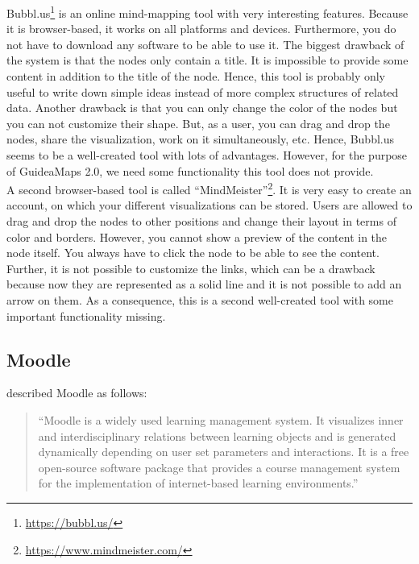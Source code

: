Bubbl.us\footnote{\url{https://bubbl.us/}} is an online mind-mapping tool with very interesting features. Because it is browser-based, it works on all platforms and devices. Furthermore, you do not have to download any software to be able to use it. The biggest drawback of the system is that the nodes only contain a title. It is impossible to provide some content in addition to the title of the node. Hence, this tool is probably only useful to write down simple ideas instead of more complex structures of related data. Another drawback is that you can only change the color of the nodes but you can not customize their shape. But, as a user, you can drag and drop the nodes, share the visualization, work on it simultaneously, etc. Hence, Bubbl.us seems to be a well-created tool with lots of advantages. However, for the purpose of GuideaMaps 2.0, we need some functionality this tool does not provide.\\

A second browser-based tool is called ``MindMeister''\footnote{\url{https://www.mindmeister.com/}}. It is very easy to create an account, on which your different visualizations can be stored. Users are allowed to drag and drop the nodes to other positions and change their layout in terms of color and borders. However, you cannot show a preview of the content in the node itself. You always have to click the node to be able to see the content. Further, it is not possible to customize the links, which can be a drawback because now they are represented as a solid line and it is not possible to add an arrow on them. As a consequence, this is a second well-created tool with some important functionality missing.


\subsection{Moodle}

\cite{scherl2012moodle} described Moodle as follows:
\begin{quote}
	``Moodle is a widely used learning management system. It visualizes inner and interdisciplinary relations between learning objects and is generated dynamically depending on user set parameters and interactions. It is a free open-source software package that provides a course management system for the implementation of internet-based learning environments.''
\end{quote}

